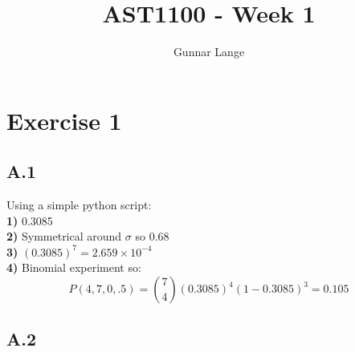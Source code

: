 \documentclass[a4paper,10pt,english]{article}
\title{AST1100 - Week 1}
\author{Gunnar Lange}
\begin{document}
\maketitle
\section*{Exercise 1}
\subsection*{A.1}
Using a simple python script:\\

\textbf{1)} 0.3085\\
\linebreak
\textbf{2)} Symmetrical around $\sigma$ so 0.68\\
\linebreak
\textbf{3)} $(0.3085)^7=2.659\times 10^{-4}$\\
\linebreak
\textbf{4)} Binomial experiment so:
$$P(4, 7, 0,.5)={7\choose 4}(0.3085)^4(1-0.3085)^3=0.105$$
\pagebreak
\subsection*{A.2}
\end{document}
